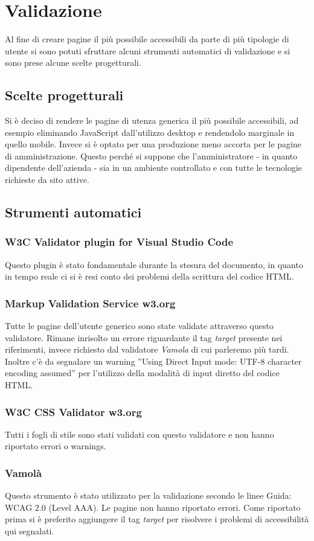 \newpage
\section{Validazione}
Al fine di creare pagine il più possibile accessibili da parte di più tipologie di utente si sono potuti sfruttare alcuni strumenti automatici di validazione e si sono prese alcune scelte progetturali.
\subsection{Scelte progetturali}
Si è deciso di rendere le pagine di utenza generica il più possibile accessibili, ad esempio eliminando JavaScript dall'utilizzo desktop e rendendolo marginale in quello mobile. Invece si è optato per una produzione meno accorta per le pagine di amministrazione. Questo perché si suppone che l'amministratore - in quanto dipendente dell'azienda - sia in un ambiente controllato e con tutte le tecnologie richieste da sito attive.
\subsection{Strumenti automatici}
\subsubsection{W3C Validator plugin for Visual Studio Code}
Questo plugin è stato fondamentale durante la stesura del documento, in quanto in tempo reale ci si è resi conto dei problemi della scrittura del codice HTML.
\subsubsection{Markup Validation Service w3.org}
Tutte le pagine dell'utente generico sono state validate attraverso questo validatore. Rimane inrisolto un errore riguardante il tag \emph{target} presente nei riferimenti, invece richiesto dal validatore \emph{Vamola} di cui parleremo più tardi. Inoltre c'è da segnalare un warning ”Using Direct Input mode: UTF-8 character encoding assumed” per l’utilizzo della modalità di input diretto del codice HTML.
\subsubsection{W3C CSS Validator w3.org}
Tutti i fogli di stile sono stati validati con questo validatore e non hanno riportato errori o warnings.
\subsubsection{Vamolà}
Questo strumento è stato utilizzato per la validazione secondo le linee Guida: WCAG 2.0 (Level AAA). Le pagine non hanno riportato errori. Come riportato prima si è preferito aggiungere il tag \emph{target} per risolvere i problemi di accessibilità qui segnalati.
